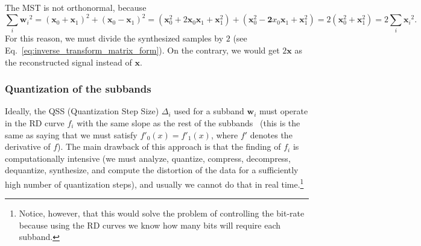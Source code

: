 The MST is not orthonormal, because
\begin{equation}
  \sum_i {{\mathbf w}_i}^2 =
  ({\mathbf x}_0 + {\mathbf x}_1)^2 + ({\mathbf x}_0 - {\mathbf x}_1)^2 =
  ({\mathbf x}_0^2 + 2{\mathbf x}_0{\mathbf x}_1+{\mathbf x}_1^2) + ({\mathbf x}_0^2-{\mathbf 2}x_0{\mathbf x}_1+{\mathbf x}_1^2) =
  2({\mathbf x}_0^2+{\mathbf x}_1^2) =
  2\sum_i {{\mathbf x}_i}^2.
  \label{eq:No_Parseval}
\end{equation}
For this reason, we must divide the synthesized samples by $2$ (see
Eq.~\eqref{eq:inverse_transform_matrix_form}). On the contrary, we
would get $2{\mathbf x}$ as the reconstructed signal instead of
${\mathbf x}$.

\subsubsection{Quantization of the subbands}
\label{sec:quantization_subbands_spatial}

Ideally, the QSS (Quantization Step Size) $\Delta_i$ used for a
subband ${\mathbf w}_i$ must operate in the RD curve $f_i$ with the
same slope as the rest of the
subbands~\cite{vetterli2014foundations,sayood2017introduction} (this
is the same as saying that we must satisfy $f'_0(x)=f'_1(x)$, where
$f'$ denotes the derivative of $f$). The main drawback of this
approach is that the finding of $f_i$ is computationally intensive (we
must analyze, quantize, compress, decompress, dequantize, synthesize,
and compute the distortion of the data for a sufficiently high number of
quantization steps), and usually we cannot do that in
real time.\footnote{Notice, however, that this would solve the problem
  of controlling the bit-rate because using the RD curves we know how
  many bits will require each subband.}

\begin{comment}
  An approximation to this could be to suppose that the RD curves of
  the subbands resulting from the analysis of our current
  piece\footnote{Remember, two samples of a stereo frame in our case
    because we are removing the spatial redundancy.} of data are
  similar to some the curves of previous pieces, that has already been
  compressed and transmitted, and therefore, we can compute also the
  distortion. Using this information, we can estimate a RD curve for
  the current piece and estimate the ``optimal'' QSSs. This procedure
  is much faster than the procedure described in the previous paragraph, but it
  may still be time consuming.
\end{comment}

